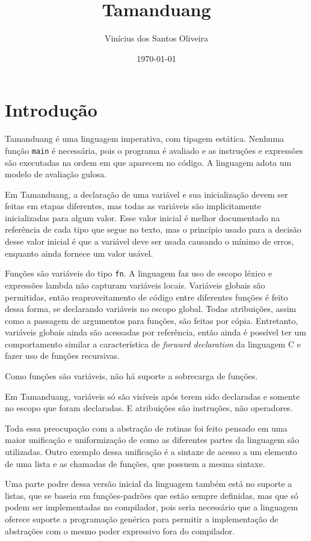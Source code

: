 \documentclass[12pt, a4paper]{article}
\title{Tamanduang}
\author{Vinícius dos Santos Oliveira}
\date{\today}
\begin{document}
\maketitle
\pagebreak
\tableofcontents
\pagebreak

\section{Introdução}

Tamanduang é uma linguagem imperativa, com tipagem estática. Nenhuma função
\texttt{main} é necessária, pois o programa é avaliado e as instruções e
expressões são executadas na ordem em que aparecem no código. A linguagem adota
um modelo de avaliação gulosa.

Em Tamanduang, a declaração de uma variável e sua inicialização devem ser feitas
em etapas diferentes, mas todas as variáveis são implicitamente inicializadas
para algum valor. Esse valor inicial é melhor documentado na referência de cada
tipo que segue no texto, mas o princípio usado para a decisão desse valor
inicial é que a variável deve ser usada causando o mínimo de erros, enquanto
ainda fornece um valor usável.

Funções são variáveis do tipo \texttt{fn}. A linguagem faz uso de escopo léxico
e expressões lambda não capturam variáveis locais. Variáveis globais são
permitidas, então reaproveitamento de código entre diferentes funções é feito
dessa forma, se declarando variáveis no escopo global. Todas atribuições, assim
como a passagem de argumentos para funções, são feitas por cópia. Entretanto,
variáveis globais ainda são acessadas por referência, então ainda é possível ter
um comportamento similar a característica de \emph{forward declaration} da
linguagem C e fazer uso de funções recursivas.

Como funções são variáveis, não há suporte a sobrecarga de funções.

Em Tamanduang, variáveis só são visíveis após terem sido declaradas e somente no
escopo que foram declaradas. E atribuições são instruções, não operadores.

Toda essa preocupação com a abstração de rotinas foi feito pensado em uma maior
unificação e uniformização de como as diferentes partes da linguagem são
utilizadas. Outro exemplo dessa unificação é a sintaxe de acesso a um elemento
de uma lista e as chamadas de funções, que possuem a mesma sintaxe.

Uma parte podre dessa versão inicial da linguagem também está no suporte a
listas, que se baseia em funções-padrões que estão sempre definidas, mas que só
podem ser implementadas no compilador, pois seria necessário que a linguagem
oferece suporte a programação genérica para permitir a implementação de
abstrações com o mesmo poder expressivo fora do compilador.
\end{document}
